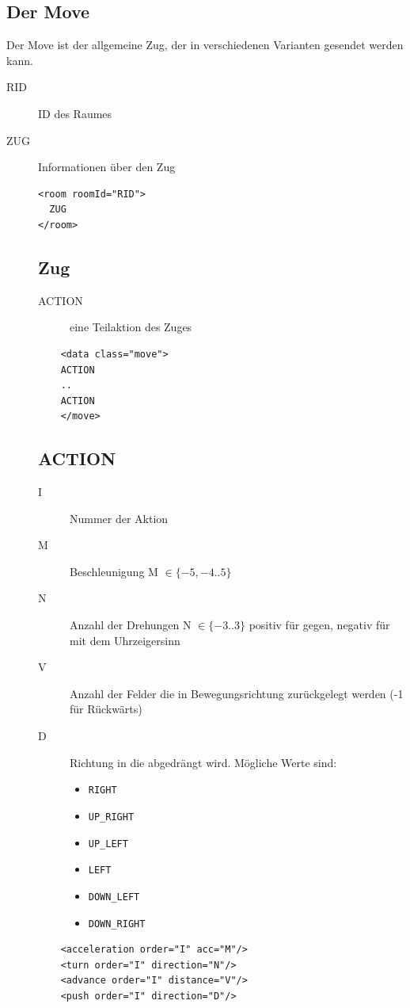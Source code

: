 \documentclass[12pt,a4paper, ngerman, oneside]{scrartcl}
\begin{document}
\subsection{\label{Move}Der Move}
Der Move ist der allgemeine Zug, der in verschiedenen Varianten gesendet werden kann.
\begin{description}
\item[RID] ID des Raumes
\item[ZUG] Informationen über den Zug
\begin{verbatim}
<room roomId="RID">
  ZUG
</room>

\end{verbatim}
\subsection{Zug}
\label{move}
\begin{description}
\item[ACTION] eine Teilaktion des Zuges
\end{description}
\begin{verbatim}
	<data class="move">
    ACTION
    ..
    ACTION
	</move>
\end{verbatim}

\subsection{ACTION}
\label{action}
\begin{description}
\item[I] Nummer der Aktion
\item[M] Beschleunigung M $\in \{-5,-4..5\}$
\item[N] Anzahl der Drehungen N $\in \{-3..3\}$ positiv für gegen, negativ für mit dem Uhrzeigersinn
\item[V] Anzahl der Felder die in Bewegungsrichtung zurückgelegt werden (-1 für Rückwärts)
\item[D] Richtung in die abgedrängt wird. Mögliche Werte sind:
\begin{itemize}
\item \verb|RIGHT|
\item \verb|UP_RIGHT|
\item \verb|UP_LEFT|
\item \verb|LEFT|
\item \verb|DOWN_LEFT|
\item \verb|DOWN_RIGHT|
\end{itemize}
\end{description}
\begin{verbatim}
	<acceleration order="I" acc="M"/>
	<turn order="I" direction="N"/>
	<advance order="I" distance="V"/>
	<push order="I" direction="D"/>
\end{verbatim}
\end{description}
\end{document}

